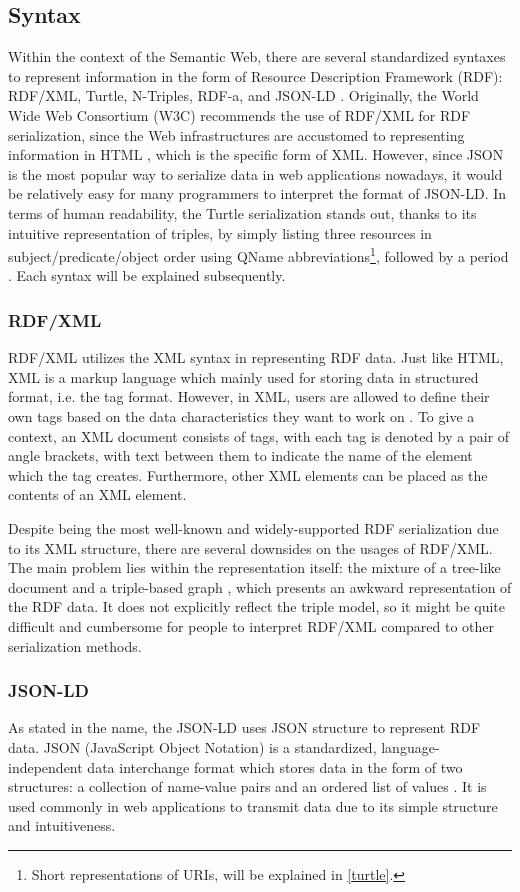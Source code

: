 \subsection{Syntax}
Within the context of the Semantic Web, there are several standardized syntaxes to represent information in the form of Resource Description Framework (RDF): RDF/XML, Turtle, N-Triples, RDF-a, and JSON-LD \citep{ldm2014}. Originally, the World Wide Web Consortium (W3C) recommends the use of RDF/XML for RDF serialization, since the Web infrastructures are accustomed to representing information in HTML \citep{swont2011}, which is the specific form of XML. However, since JSON is the most popular way to serialize data in web applications nowadays, it would be relatively easy for many programmers to interpret the format of JSON-LD. In terms of human readability, the Turtle serialization stands out, thanks to its intuitive representation of triples, by simply listing three resources in subject/predicate/object order using QName abbreviations\footnote{Short representations of URIs, will be explained in \ref{turtle}.}, followed by a period \citep{swont2011}. Each syntax will be explained subsequently.

\subsubsection{RDF/XML}
RDF/XML utilizes the XML syntax in representing RDF data. Just like HTML, XML is a markup language which mainly used for storing data in structured format, i.e. the tag format. However, in XML, users are allowed to define their own tags based on the data characteristics they want to work on \citep{xmlrdf2000}. To give a context, an XML document consists of tags, with each tag is denoted by a pair of angle brackets, with text between them to indicate the name of the element which the tag creates. Furthermore, other XML elements can be placed as the contents of an XML element.

Despite being the most well-known and widely-supported RDF serialization due to its XML structure, there are several downsides on the usages of RDF/XML. The main problem lies within the representation itself: the mixture of a tree-like document and a triple-based graph \citep{rdfser2019}, which presents an awkward representation of the RDF data. It does not explicitly reflect the triple model, so it might be quite difficult and cumbersome for people to interpret RDF/XML compared to other serialization methods.

\subsubsection{JSON-LD}
As stated in the name, the JSON-LD uses JSON structure to represent RDF data. JSON (JavaScript Object Notation) is a standardized, language-independent data interchange format which stores data in the form of two structures: a collection of name-value pairs and an ordered list of values \citep{json}. It is used commonly in web applications to transmit data \citep{MDNJSON} due to its simple structure and intuitiveness.

